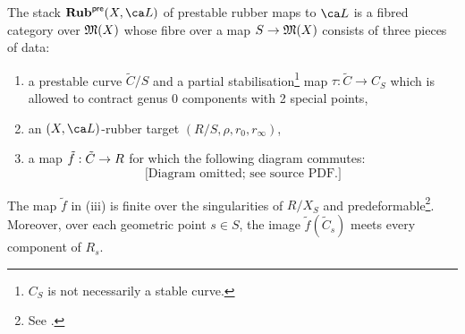 \begin{definition}
\notready\label{def:prestable_rubber_maps}
The stack $\cat{Rub}^{\pre}(X, \ca L)$ of prestable rubber maps to $\ca L$ is a fibred category over $\frak M(X)$ whose fibre over a map $S \to \frak M(X)$ consists of
three pieces of data:
\begin{enumerate}
\item[(i)]
a prestable curve $\tilde C /S$ and a partial
stabilisation{\footnote{$C_S$ is not
necessarily a stable curve.}}
map $\tau\colon \tilde C \to C_S$ which is allowed to contract
genus 0 components with 2 special points,
\item[(ii)] an $(X,\ca L)$-rubber target $(R/S,\rho,r_0,r_\infty)$,




\item[(iii)] a map $\tilde{f}: \tilde C \to R$ for which
the following diagram commutes:
\begin{equation}
\text{[Diagram omitted; see source PDF.]}
\end{equation}
\end{enumerate}
The map $\tilde{f}$ in (iii) is finite over the singularities of $R/X_S$ and
predeformable{\footnote{See \cite{Li2001-Stable}.}}.
Moreover, over each geometric point $s\in S$, the image $\tilde{f}(\tilde{C}_s)$
meets
every component of $R_s$.

\end{definition}


